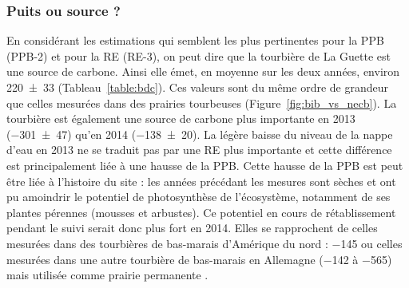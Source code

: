 \subsubsection{Puits ou source ?}

En considérant les estimations qui semblent les plus pertinentes pour la PPB (PPB-2) et pour la RE (RE-3), on peut dire que la tourbière de La Guette est une source de carbone.
Ainsi elle émet, en moyenne sur les deux années, environ \SI{220(33)}{\gcma} (Tableau~\ref{table:bdc}).
Ces valeurs sont du même ordre de grandeur que celles mesurées dans des prairies tourbeuses (Figure~\ref{fig:bib_vs_necb}).
La tourbière est également une source de carbone plus importante en 2013 (\SI{-301(47)}{\gcma}) qu'en 2014 (\SI{-138(20)}{\gcma}).
La légère baisse du niveau de la nappe d'eau en 2013 ne se traduit pas par une RE plus importante et cette différence est principalement liée à une hausse de la PPB.
Cette hausse de la PPB est peut être liée à l'histoire du site : les années précédant les mesures sont sèches et ont pu amoindrir le potentiel de photosynthèse de l'écosystème, notamment de ses plantes pérennes (mousses et arbustes).
Ce potentiel en cours de rétablissement pendant le suivi serait donc plus fort en 2014.
Elles se rapprochent de celles mesurées dans des tourbières de bas-marais d'Amérique du nord : \SI{-145}{\gcma} \citep{carroll1997} ou celles mesurées dans une autre tourbière de bas-marais en Allemagne (\num{-142} à \SI{-565}{\gcma}) mais utilisée comme prairie permanente \citep{beyer2015}.


